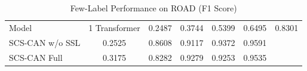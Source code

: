 \begin{table}[t]
\centering
\caption{Few-Label Performance on ROAD (F1 Score)}
\label{tab:fewlabel}
\small
\begin{tabular}{lccccc}
\toprule
Model & 1%
\midrule
Transformer & 0.2487 & 0.3744 & 0.5399 & 0.6495 & 0.8301 \\
SCS-CAN w/o SSL & 0.2525 & 0.8608 & 0.9117 & 0.9372 & 0.9591 \\
SCS-CAN Full & 0.3175 & 0.8282 & 0.9279 & 0.9253 & 0.9535 \\
\bottomrule
\end{tabular}
\end{table}